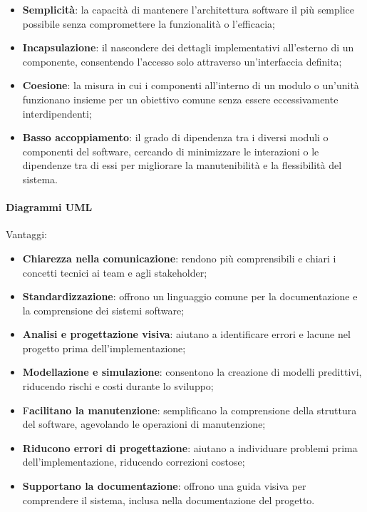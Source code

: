 \begin{itemize}
    \item \textbf{Semplicità}: la capacità di mantenere l'architettura software il più semplice possibile senza compromettere la funzionalità o l'efficacia;
    \item \textbf{Incapsulazione}: il nascondere dei dettagli implementativi all'esterno di un componente, consentendo l'accesso solo attraverso un'interfaccia definita;
    \item \textbf{Coesione}: la misura in cui i componenti all'interno di un modulo o un'unità funzionano insieme per un obiettivo comune senza essere eccessivamente interdipendenti;
    \item \textbf{Basso accoppiamento}: il grado di dipendenza tra i diversi moduli o componenti del software, cercando di minimizzare le interazioni o le dipendenze tra di essi per migliorare la manutenibilità e la flessibilità del sistema.
\end{itemize}

\paragraph{Diagrammi UML}
Vantaggi:
\begin{itemize}
    \item \textbf{Chiarezza nella comunicazione}: rendono più comprensibili e chiari i concetti tecnici ai team e agli stakeholder;
    \item \textbf{Standardizzazione}: offrono un linguaggio comune per la documentazione e la comprensione dei sistemi software;
    \item \textbf{Analisi e progettazione visiva}: aiutano a identificare errori e lacune nel progetto prima dell'implementazione;
    \item \textbf{Modellazione e simulazione}: consentono la creazione di modelli predittivi, riducendo rischi e costi durante lo sviluppo;
    \item F\textbf{acilitano la manutenzione}: semplificano la comprensione della struttura del software, agevolando le operazioni di manutenzione;
    \item \textbf{Riducono errori di progettazione}: aiutano a individuare problemi prima dell'implementazione, riducendo correzioni costose;
    \item \textbf{Supportano la documentazione}: offrono una guida visiva per comprendere il sistema, inclusa nella documentazione del progetto.
\end{itemize}

